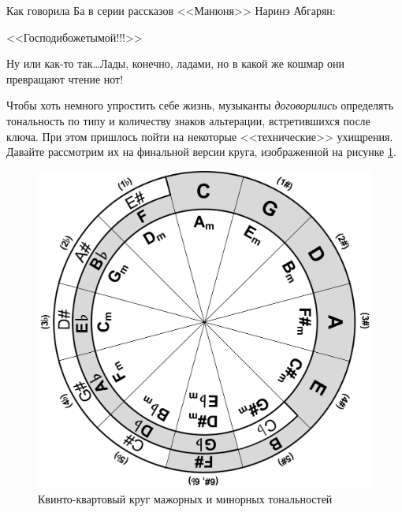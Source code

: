 Как говорила Ба в серии рассказов <<Манюня>> Наринэ Абгарян: 
\begin{center}
<<Господибожетымой!!!>> 
\end{center}

Ну или как-то так\ldots Лады, конечно, ладами, но в какой же кошмар они превращают чтение нот!

Чтобы хоть немного упростить себе жизнь, музыканты \emph{договорились} определять тональность по типу и количеству знаков альтерации, встретившихся после ключа. При этом пришлось пойти на некоторые <<технические>> ухищрения. Давайте рассмотрим их на финальной версии круга, изображенной на рисунке \ref{fig:harmony:kvinto-kvarto:kvinto-kvarto-final}.

\begin{figure}[!ht]
    \centering
    \includegraphics[scale=0.8]{fig/kvinto-kvarto/kvinto-kvarto-final} 
    \caption{Квинто-квартовый круг мажорных и минорных тональностей}\label{fig:harmony:kvinto-kvarto:kvinto-kvarto-final}
\end{figure}

